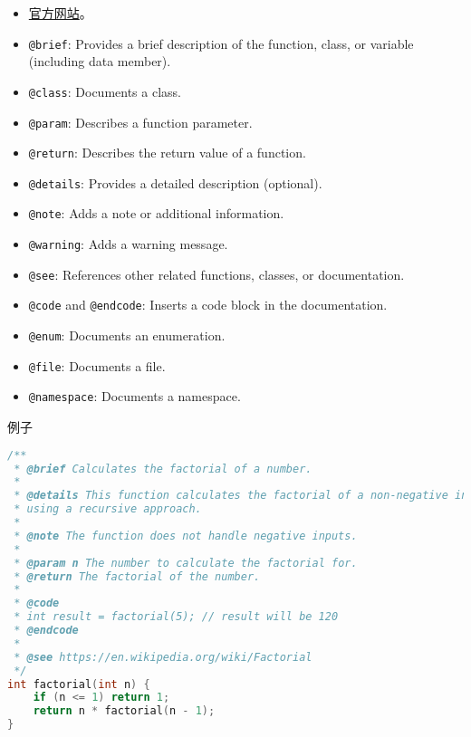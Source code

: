 
\begin{issues}
\issueDraft
\end{issues}

\begin{itemize}
\item \href{https://www.doxygen.nl/}{官方网站}。
\item \verb`@brief`: Provides a brief description of the function, class, or variable (including data member).
\item \verb`@class`: Documents a class.
\item \verb`@param`: Describes a function parameter.
\item \verb`@return`: Describes the return value of a function.
\item \verb`@details`: Provides a detailed description (optional).
\item \verb`@note`: Adds a note or additional information.
\item \verb`@warning`: Adds a warning message.
\item \verb`@see`: References other related functions, classes, or documentation.
\item \verb`@code` and \verb`@endcode`: Inserts a code block in the documentation.
\item \verb`@enum`: Documents an enumeration.
\item \verb`@file`: Documents a file.
\item \verb`@namespace`: Documents a namespace.
\end{itemize}

例子
\begin{lstlisting}[language=cpp,caption=factorial.hpp]
/**
 * @brief Calculates the factorial of a number.
 *
 * @details This function calculates the factorial of a non-negative integer
 * using a recursive approach.
 *
 * @note The function does not handle negative inputs.
 *
 * @param n The number to calculate the factorial for.
 * @return The factorial of the number.
 *
 * @code
 * int result = factorial(5); // result will be 120
 * @endcode
 *
 * @see https://en.wikipedia.org/wiki/Factorial
 */
int factorial(int n) {
    if (n <= 1) return 1;
    return n * factorial(n - 1);
}
\end{lstlisting}

